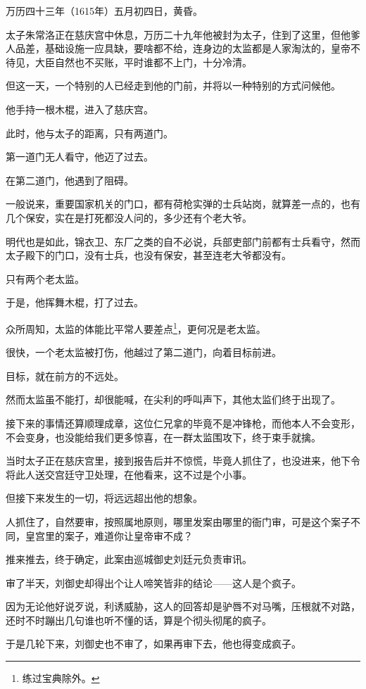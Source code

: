 \begin{multicols}{\theparacolNo}
		万历四十三年（1615年）五月初四日，黄昏。

		太子朱常洛正在慈庆宫中休息，万历二十九年他被封为太子，住到了这里，但他爹人品差，基础设施一应具缺，要啥都不给，连身边的太监都是人家淘汰的，皇帝不待见，大臣自然也不买账，平时谁都不上门，十分冷清。

		但这一天，一个特别的人已经走到他的门前，并将以一种特别的方式问候他。

		他手持一根木棍，进入了慈庆宫。

		此时，他与太子的距离，只有两道门。

		第一道门无人看守，他迈了过去。

		在第二道门，他遇到了阻碍。

		一般说来，重要国家机关的门口，都有荷枪实弹的士兵站岗，就算差一点的，也有几个保安，实在是打死都没人问的，多少还有个老大爷。

		明代也是如此，锦衣卫、东厂之类的自不必说，兵部吏部门前都有士兵看守，然而太子殿下的门口，没有士兵，也没有保安，甚至连老大爷都没有。

		只有两个老太监。

		于是，他挥舞木棍，打了过去。

		众所周知，太监的体能比平常人要差点\footnote{练过宝典除外。}，更何况是老太监。

		很快，一个老太监被打伤，他越过了第二道门，向着目标前进。

		目标，就在前方的不远处。

		然而太监虽不能打，却很能喊，在尖利的呼叫声下，其他太监们终于出现了。

		接下来的事情还算顺理成章，这位仁兄拿的毕竟不是冲锋枪，而他本人不会变形，不会变身，也没能给我们更多惊喜，在一群太监围攻下，终于束手就擒。

		当时太子正在慈庆宫里，接到报告后并不惊慌，毕竟人抓住了，也没进来，他下令将此人送交宫廷守卫处理，在他看来，这不过是个小事。

		但接下来发生的一切，将远远超出他的想象。

		人抓住了，自然要审，按照属地原则，哪里发案由哪里的衙门审，可是这个案子不同，皇宫里的案子，难道你让皇帝审不成？

		推来推去，终于确定，此案由巡城御史刘廷元负责审讯。

		审了半天，刘御史却得出个让人啼笑皆非的结论——这人是个疯子。

		因为无论他好说歹说，利诱威胁，这人的回答却是驴唇不对马嘴，压根就不对路，还时不时蹦出几句谁也听不懂的话，算是个彻头彻尾的疯子。

		于是几轮下来，刘御史也不审了，如果再审下去，他也得变成疯子。


\end{multicols}

